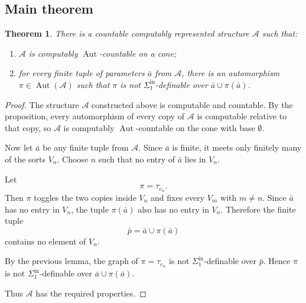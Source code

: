 \documentclass[12pt]{article}
\newtheorem{theorem}{Theorem}
\newcommand{\Aut}{\operatorname{Aut}}
\begin{document}
\subsection*{Main theorem}

\begin{theorem}
There is a countable computably represented structure $\mathcal A$ such that:
\begin{enumerate}
\item $\mathcal A$ is computably $\Aut$-countable on a cone;
\item for every finite tuple of parameters $\bar a$ from $\mathcal A$, there is an automorphism $\pi\in\Aut(\mathcal A)$ such that $\pi$ is not
$\Sigma^{\mathrm{in}}_1$-definable over $\bar a\cup\pi(\bar a)$.
\end{enumerate}
\end{theorem}

\begin{proof}
The structure $\mathcal A$ constructed above is computable and countable.  By the proposition, every automorphism of every copy of $\mathcal A$ is computable relative to that copy, so $\mathcal A$ is computably $\Aut$-countable on the cone with base $\emptyset$.

Now let $\bar a$ be any finite tuple from $\mathcal A$.  Since $\bar a$ is finite, it meets only finitely many of the sorts $V_n$.  Choose $n$ such that no entry of $\bar a$ lies in $V_n$.

Let
\[
\pi=\tau_{e_n}.
\]
Then $\pi$ toggles the two copies inside $V_n$ and fixes every $V_m$ with $m\neq n$.  Since $\bar a$ has no entry in $V_n$, the tuple $\pi(\bar a)$ also has no entry in $V_n$.  Therefore the finite tuple
\[
\bar p=\bar a\cup\pi(\bar a)
\]
contains no element of $V_n$.

By the previous lemma, the graph of $\pi=\tau_{e_n}$ is not
$\Sigma^{\mathrm{in}}_1$-definable over $\bar p$.  Hence $\pi$ is not
$\Sigma^{\mathrm{in}}_1$-definable over $\bar a\cup\pi(\bar a)$.

Thus $\mathcal A$ has the required properties.
\end{proof}
\end{document}
